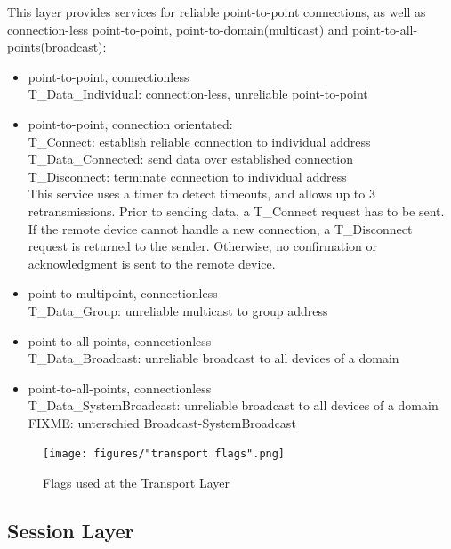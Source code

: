 This layer provides services for reliable point-to-point connections, as well as connection-less point-to-point, 
point-to-domain(multicast) and point-to-all-points(broadcast):

\begin{itemize}
 \item point-to-point, connectionless\\T\_Data\_Individual: connection-less, unreliable point-to-point

 \item point-to-point, connection orientated:
 \\T\_Connect: establish reliable connection to individual address
 \\ 
 T\_Data\_Connected: send data over established connection
 \\ 
 T\_Disconnect: terminate connection to individual address 
 \\
 This service uses a timer to detect timeouts, and allows up to 3 retransmissions. Prior to sending data, a T\_Connect request has to be sent. If the
 remote device cannot handle a new connection, a T\_Disconnect request is returned to the sender. Otherwise, no confirmation or acknowledgment is sent
 to the remote device.
 
 \item point-to-multipoint, connectionless
 \\
 T\_Data\_Group: unreliable multicast to group address

 \item point-to-all-points, connectionless
 \\
 T\_Data\_Broadcast: unreliable broadcast to all devices of a domain

 \item point-to-all-points, connectionless
 \\
 T\_Data\_SystemBroadcast: unreliable broadcast to all devices of a domain FIXME: unterschied Broadcast-SystemBroadcast
\end{itemize}

\begin{figure}
    \centering
    \texttt{[image: figures/"transport flags".png]}
    \caption{Flags used at the Transport Layer}
    \label{fig:tFlags}
\end{figure}

\subsection{Session Layer}

